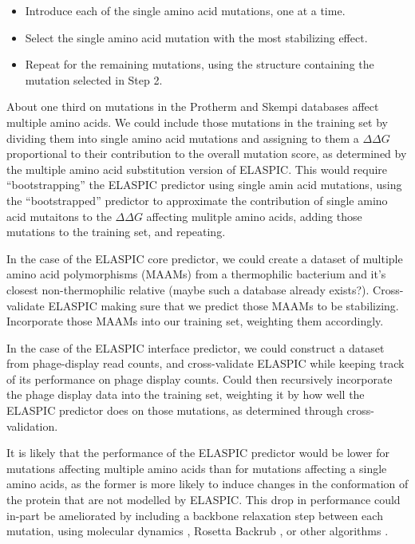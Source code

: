 \begin{itemize}
	\itemsep0em
    \item Introduce each of the single amino acid mutations, one at a time.
    \item Select the single amino acid mutation with the most stabilizing effect.
    \item Repeat for the remaining mutations, using the structure containing the mutation selected in Step 2.
\end{itemize}

About one third on mutations in the Protherm and Skempi databases affect multiple amino acids. We could include those mutations in the training set by dividing them into single amino acid mutations and assigning to them a $\Delta \Delta G$ proportional to their contribution to the overall mutation score, as determined by the multiple amino acid substitution version of ELASPIC. This would require ``bootstrapping'' the ELASPIC predictor using single amin acid mutations, using the ``bootstrapped'' predictor to approximate the contribution of single amino acid mutaitons to the $\Delta \Delta G$ affecting mulitple amino acids, adding those mutations to the training set, and repeating.

In the case of the ELASPIC core predictor, we could create a dataset of multiple amino acid polymorphisms (MAAMs) from a thermophilic bacterium and it's closest non-thermophilic relative (maybe such a database already exists?). Cross-validate ELASPIC making sure that we predict those MAAMs to be stabilizing. Incorporate those MAAMs into our training set, weighting them accordingly.

In the case of the ELASPIC interface predictor, we could construct a dataset from phage-display read counts, and cross-validate ELASPIC while keeping track of its performance on phage display counts. Could then recursively incorporate the phage display data into the training set, weighting it by how well the ELASPIC predictor does on those mutations, as determined through cross-validation.

It is likely that the performance of the ELASPIC predictor would be lower for mutations affecting multiple amino acids than for mutations affecting a single amino acids, as the former is more likely to induce changes in the conformation of the protein that are not modelled by ELASPIC. This drop in performance could in-part be ameliorated by including a backbone relaxation step between each mutation, using molecular dynamics \cite{abraham_gromacs:_2015}, Rosetta Backrub \cite{smith_predicting_2011}, or other algorithms \cite{sun_protein_2016}.

